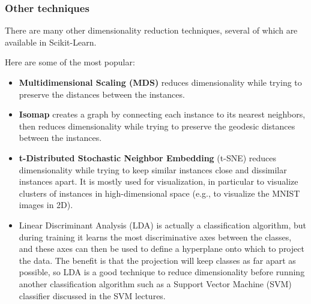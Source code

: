 \documentclass{beamer}
\begin{document}
\begin{frame}
\frametitle{Other techniques}

There are many other dimensionality reduction techniques, several of which are available in Scikit-Learn.

Here are some of the most popular:
\begin{itemize}
\item \textbf{Multidimensional Scaling (MDS)} reduces dimensionality while trying to preserve the distances between the instances.

\item \textbf{Isomap} creates a graph by connecting each instance to its nearest neighbors, then reduces dimensionality while trying to preserve the geodesic distances between the instances.

\item \textbf{t-Distributed Stochastic Neighbor Embedding} (t-SNE) reduces dimensionality while trying to keep similar instances close and dissimilar instances apart. It is mostly used for visualization, in particular to visualize clusters of instances in high-dimensional space (e.g., to visualize the MNIST images in 2D).

\item Linear Discriminant Analysis (LDA) is actually a classification algorithm, but during training it learns the most discriminative axes between the classes, and these axes can then be used to define a hyperplane onto which to project the data. The benefit is that the projection will keep classes as far apart as possible, so LDA is a good technique to reduce dimensionality before running another classification algorithm such as a Support Vector Machine (SVM) classifier discussed in the SVM lectures.
\end{itemize}

\noindent
\end{frame}
\end{document}
